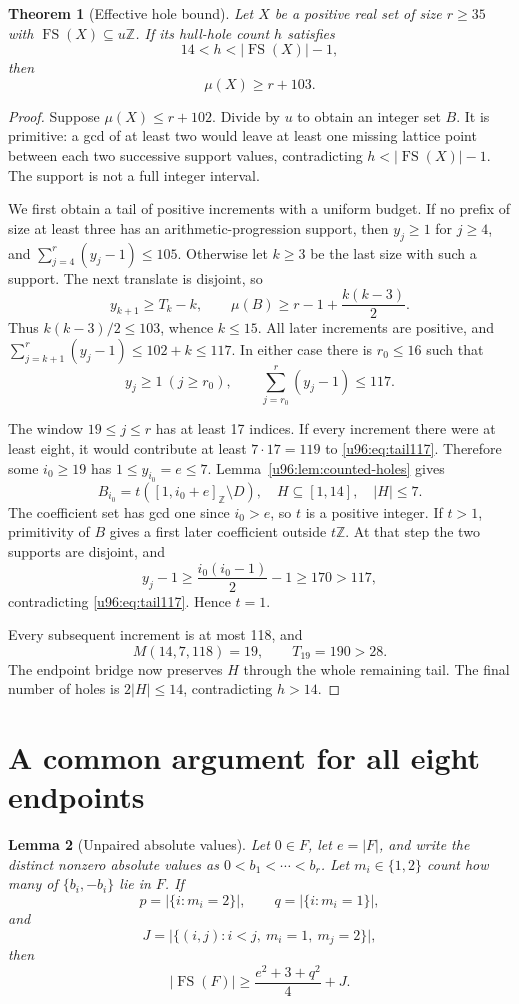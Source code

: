 \documentclass[11pt,a4paper]{article}
\newtheorem{theorem}{Theorem}[section]
\newtheorem{lemma}[theorem]{Lemma}
\theoremstyle{remark}
\newcommand{\FS}{\operatorname{FS}}
\newcommand{\card}[1]{\lvert #1\rvert}
\begin{document}
\begin{theorem}[Effective hole bound]\label{u96:thm:holes103}
Let $X$ be a positive real set of size $r\geq35$ with
$\FS(X)\subseteq u\mathbb Z$. If its hull-hole count $h$ satisfies
\[
14<h<|\FS(X)|-1,
\]
then
\[
\boxed{\mu(X)\geq r+103.}
\]
\end{theorem}
\begin{proof}
Suppose $\mu(X)\leq r+102$. Divide by $u$ to obtain an integer set $B$.
It is primitive: a gcd of at least two would leave at least one missing
lattice point between each two successive support values, contradicting
$h<|\FS(X)|-1$. The support is not a full integer interval.

We first obtain a tail of positive increments with a uniform budget.
If no prefix of size at least three has an arithmetic-progression support,
then $y_j\geq1$ for $j\geq4$, and
$\sum_{j=4}^r(y_j-1)\leq105$.
Otherwise let $k\geq3$ be the last size with such a support. The next
translate is disjoint, so
\[
y_{k+1}\geq T_k-k,
\qquad
\mu(B)\geq r-1+\frac{k(k-3)}2.
\]
Thus $k(k-3)/2\leq103$, whence $k\leq15$. All later increments are
positive, and
$\sum_{j=k+1}^r(y_j-1)\leq102+k\leq117$.
In either case there is $r_0\leq16$ such that
\begin{equation}
y_j\geq1\ (j\geq r_0),\qquad
\sum_{j=r_0}^r(y_j-1)\leq117.\label{u96:eq:tail117}
\end{equation}

The window $19\leq j\leq r$ has at least 17 indices. If every increment
there were at least eight, it would contribute at least $7\cdot17=119$
to \eqref{u96:eq:tail117}. Therefore some $i_0\geq19$ has $1\leq y_{i_0}=e\leq7$.
Lemma~\ref{u96:lem:counted-holes} gives
\[
B_{i_0}=t([1,i_0+e]_{\mathbb Z}\setminus D),\quad
H\subseteq[1,14],\quad |H|\leq7.
\]
The coefficient set has gcd one since $i_0>e$, so $t$ is a positive integer.
If $t>1$, primitivity of $B$ gives a first later coefficient outside
$t\mathbb Z$. At that step the two supports are disjoint, and
\[
y_j-1\geq\frac{i_0(i_0-1)}2-1\geq170>117,
\]
contradicting \eqref{u96:eq:tail117}. Hence $t=1$.

Every subsequent increment is at most 118, and
\[
M(14,7,118)=19,\qquad T_{19}=190>28.
\]
The endpoint bridge now preserves $H$ through the whole remaining tail.
The final number of holes is $2|H|\leq14$, contradicting $h>14$.
\end{proof}

\section{A common argument for all eight endpoints}\label{u96:sec:endpoints}
\begin{lemma}[Unpaired absolute values]\label{u96:lem:unpaired}
Let $0\in F$, let $e=\card F$, and write the distinct nonzero absolute values
as $0<b_1<\cdots<b_r$.  Let $m_i\in\{1,2\}$ count how many of
$\{b_i,-b_i\}$ lie in $F$.  If
\[
 p=\card{\{i:m_i=2\}},\qquad q=\card{\{i:m_i=1\}},
\]
and
\[
 J=\card{\{(i,j):i<j,\ m_i=1,\ m_j=2\}},
\]
then
\begin{equation}
 \card{\FS(F)}\geq\frac{e^2+3+q^2}{4}+J.
 \label{u96:eq:unpaired}
\end{equation}
\end{lemma}
\end{document}
